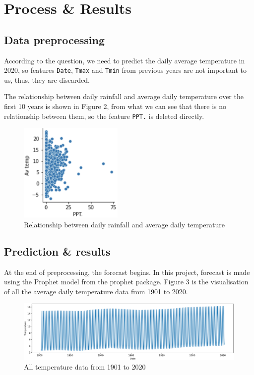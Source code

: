 \documentclass{article}
\begin{document}
\newpage

\section{Process \& Results}

\subsection{Data preprocessing}

According to the question, we need to predict the daily average temperature in 2020, so features \verb|Date|, \verb|Tmax| and \verb|Tmin| from previous years are not important to us, thus, they are discarded.

The relationship between daily rainfall and average daily temperature over the first 10 years is shown in Figure 2, from what we can see that there is no relationship between them, so the feature \verb|PPT.| is deleted directly.

\begin{figure}[htbp]
\centering
\includegraphics[width=5cm]{rela.png} %
\caption{Relationship between daily rainfall and average daily temperature} %
\end{figure}


\subsection{Prediction \& results}

At the end of preprocessing, the forecast begins. In this project, forecast is made using the Prophet model from the prophet package. Figure 3 is the visualisation of all the average daily temperature data from 1901 to 2020.

\begin{figure}[htbp]
\centering
\includegraphics[width=13cm]{wholeyears.png} %
\caption{All temperature data from 1901 to 2020} %
\end{figure}
\end{document}
